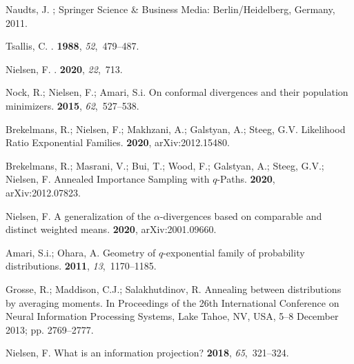 \documentclass[entropy,article,accept,oneauthor,pdftex,entropy]{Definitions/mdpi}
\begin{document}
\begin{thebibliography}{999}
Naudts, J.
; Springer Science \& Business
  Media:  {Berlin/Heidelberg, Germany,} 2011.

Tsallis, C.
.
 {\bf 1988}, {\em 52},~479--487.

Nielsen, F.
.
 {\bf 2020}, {\em 22},~713.

Nock, R.; Nielsen, F.; Amari, S.i.
\newblock On conformal divergences and their population minimizers.
 {\bf 2015}, {\em
  62},~527--538.

Brekelmans, R.; Nielsen, F.; Makhzani, A.; Galstyan, A.; Steeg, G.V.
\newblock Likelihood Ratio Exponential Families.
 {\bf 2020}, arXiv:2012.15480.

Brekelmans, R.; Masrani, V.; Bui, T.; Wood, F.; Galstyan, A.; Steeg, G.V.;
  Nielsen, F.
\newblock Annealed Importance Sampling with $q$-Paths.
 {\bf 2020}, arXiv:2012.07823.

Nielsen, F.
\newblock A generalization of the $\alpha$-divergences based on comparable and
  distinct weighted means.
 {\bf 2020},  arXiv:2001.09660.

Amari, S.i.; Ohara, A.
\newblock Geometry of $q$-exponential family of probability distributions.
 {\bf 2011}, {\em 13},~1170--1185.

Grosse, R.; Maddison, C.J.; Salakhutdinov, R.
\newblock Annealing between distributions by averaging moments.
\newblock  In Proceedings of the 26th International Conference on Neural
  Information Processing Systems,   {Lake Tahoe, NV, USA, 5--8  December} 2013; pp. 2769--2777.

Nielsen, F.
\newblock What is an information projection?
 {\bf 2018}, {\em 65},~321--324.


\end{thebibliography}
\end{document}

